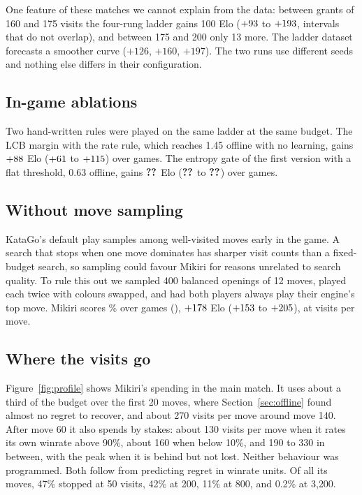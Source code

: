 One feature of these matches we cannot explain from the data: between grants of 160 and 175 visits the four-rung ladder gains 100 Elo ($+93$ to $+193$, intervals that do not overlap), and between 175 and 200 only 13 more. The ladder dataset forecasts a smoother curve ($+126$, $+160$, $+197$). The two runs use different seeds and nothing else differs in their configuration.

\subsection{In-game ablations}

Two hand-written rules were played on the same ladder at the same budget. The LCB margin with the rate rule, which reaches 1.45 offline with no learning, gains $+88$ Elo ($+61$ to $+115$) over  games. The entropy gate of the first version with a flat threshold, 0.63 offline, gains $\textbf{??}$ Elo ($\textbf{??}$ to $\textbf{??}$) over \vonegateGames{} games.

\subsection{Without move sampling}

KataGo's default play samples among well-visited moves early in the game. A search that stops when one move dominates has sharper visit counts than a fixed-budget search, so sampling could favour Mikiri for reasons unrelated to search quality. To rule this out we sampled 400 balanced openings of 12 moves, played each twice with colours swapped, and had both players always play their engine's top move. Mikiri scores \pairedScore\% over \pairedGames{} games (\pairedRecord), $+178$ Elo ($+153$ to $+205$), at \pairedVisits{} visits per move.

\subsection{Where the visits go}

Figure~\ref{fig:profile} shows Mikiri's spending in the main match. It uses about a third of the budget over the first 20 moves, where Section~\ref{sec:offline} found almost no regret to recover, and about 270 visits per move around move 140. After move 60 it also spends by stakes: about 130 visits per move when it rates its own winrate above 90\%, about 160 when below 10\%, and 190 to 330 in between, with the peak when it is behind but not lost. Neither behaviour was programmed. Both follow from predicting regret in winrate units. Of all its moves, 47\% stopped at 50 visits, 42\% at 200, 11\% at 800, and 0.2\% at 3{,}200.

